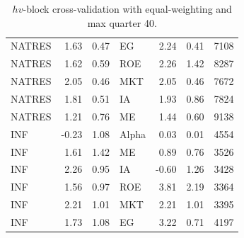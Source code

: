 \documentclass[12pt]{article}
\begin{document}
\begin{table}[ht]
\begin{tabular}{lrrlrrl}
		NATRES & 1.63 & 0.47 & EG & 2.24 & 0.41 & 7108 \\ 
		NATRES & 1.62 & 0.59 & ROE & 2.26 & 1.42 & 8287 \\ 
		NATRES & 2.05 & 0.46 & MKT & 2.05 & 0.46 & 7672 \\ 
		NATRES & 1.81 & 0.51 & IA & 1.93 & 0.86 & 7824 \\ 
		NATRES & 1.21 & 0.76 & ME & 1.44 & 0.60 & 9138 \\ 
		INF & -0.23 & 1.08 & Alpha & 0.03 & 0.01 & 4554 \\ 
		INF & 1.61 & 1.42 & ME & 0.89 & 0.76 & 3526 \\ 
		INF & 2.26 & 0.95 & IA & -0.60 & 1.26 & 3428 \\ 
		INF & 1.56 & 0.97 & ROE & 3.81 & 2.19 & 3364 \\ 
		INF & 2.21 & 1.01 & MKT & 2.21 & 1.01 & 3395 \\ 
		INF & 1.73 & 1.08 & EG & 3.22 & 0.71 & 4197 \\ 
		\hline
	\end{tabular}
	\caption{$hv$-block cross-validation with equal-weighting and max quarter 40.} 
	\label{tab:cv_40_ew}
\end{table}
\end{document}

